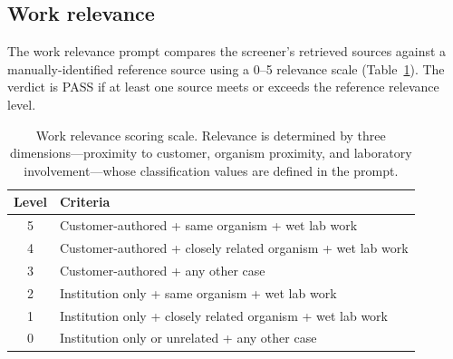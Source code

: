 \documentclass[12pt]{article}
\begin{document}
\subsection{Work relevance}

The work relevance prompt compares the screener's retrieved sources against a manually-identified reference source using a 0--5 relevance scale (Table~\ref{tab:relevance_scale}). The verdict is PASS if at least one source meets or exceeds the reference relevance level.

\begin{table}[H]
\centering
\caption{Work relevance scoring scale. Relevance is determined by three dimensions---proximity to customer, organism proximity, and laboratory involvement---whose classification values are defined in the prompt.}
\label{tab:relevance_scale}
\begin{tabular}{cl}
\toprule
\textbf{Level} & \textbf{Criteria} \\
\midrule
5 & Customer-authored + same organism + wet lab work \\
4 & Customer-authored + closely related organism + wet lab work \\
3 & Customer-authored + any other case \\
2 & Institution only + same organism + wet lab work \\
1 & Institution only + closely related organism + wet lab work \\
0 & Institution only or unrelated + any other case \\
\bottomrule
\end{tabular}
\end{table}
\end{document}
